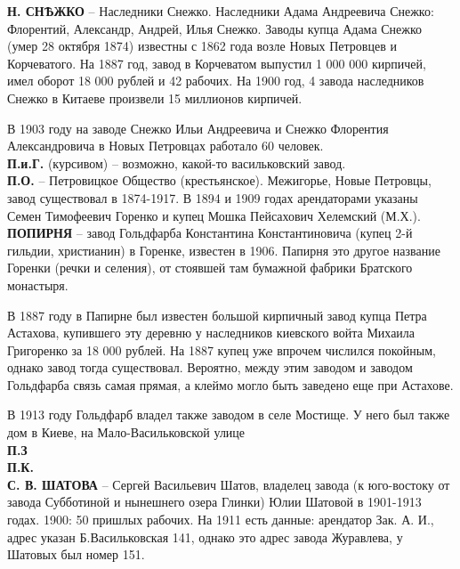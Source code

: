 \noindent\textbf{Н. СНѢЖКО} – Наследники Снежко. Наследники Адама Андреевича Снежко: Флорентий, Александр, Андрей, Илья Снежко. Заводы купца Адама Снежко (умер 28 октября 1874) известны с 1862 года возле Новых Петровцев и Корчеватого. На 1887 год, завод в Корчеватом выпустил 1 000 000 кирпичей, имел оборот 18 000 рублей и 42 рабочих. На 1900 год, 4 завода наследников Снежко в Китаеве произвели 15 миллионов кирпичей.

В 1903 году на заводе Снежко Ильи Андреевича и Снежко Флорентия Александровича в Новых Петровцах работало 60 человек.\\

\noindent\textbf{П.и.Г.} (курсивом) – возможно, какой-то васильковский завод.\\

\noindent\textbf{П.О.} – Петровицкое Общество (крестьянское). Межигорье, Новые Петровцы, завод существовал в 1874-1917. В 1894 и 1909 годах арендаторами указаны Семен Тимофеевич Горенко и купец Мошка Пейсахович Хелемский (М.Х.).\\

\noindent\textbf{ПОПИРНЯ} – завод Гольдфарба Константина Константиновича (купец 2-й гильдии, христианин) в Горенке, известен в 1906. Папирня это другое название Горенки (речки и селения), от стоявшей там бумажной фабрики Братского монастыря.

В 1887 году в Папирне был известен большой кирпичный завод купца Петра Астахова, купившего эту деревню у наследников киевского войта Михаила Григоренко за 18 000 рублей. На 1887 купец уже впрочем числился покойным, однако завод тогда существовал. Вероятно, между этим заводом и заводом Гольдфарба связь самая прямая, а клеймо могло быть заведено еще при Астахове.

В 1913 году Гольдфарб владел также заводом в селе Мостище. У него был также дом в Киеве, на Мало-Васильковской улице\\

\noindent\textbf{П.З}\\

\noindent\textbf{П.К.}\\

\noindent\textbf{С. В. ШАТОВА} – Сергей Васильевич Шатов, владелец завода (к юго-востоку от завода Субботиной и нынешнего озера Глинки) Юлии Шатовой в 1901-1913 годах. 1900: 50 пришлых рабочих. На 1911 есть данные: арендатор Зак. А. И., адрес указан Б.Васильковская 141, однако это адрес завода Журавлева, у Шатовых был номер 151.\\

